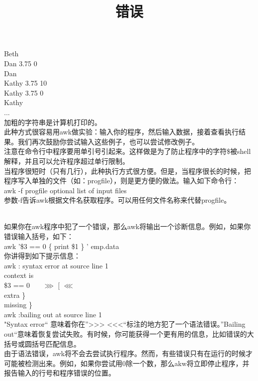 \documentclass[10pt,fancyhdr,UTF-8]{ctexart}
\begin{document}
Beth  \\
Dan       3.75      0 \\
Dan   \\ 
Kathy     3.75      10 \\
Kathy     3.75      0 \\
Kathy \\
...   \\
加粗的字符串是计算机打印的。 \\
此种方式很容易用awk做实验：输入你的程序，然后输入数据，接着查看执行结果。我们再次鼓励你尝试输入这些例子，也可以尝试修改例子。 \\
注意在命令行中程序要用单引号引起来。这样做是为了防止程序中的字符\$被shell解释，并且可以允许程序超过单行限制。 \\
当程序很短时（只有几行），此种执行方式很方便。但是，当程序很长的时候，把程序写入单独的文件（如：progfile），则是更方便的做法。输入如下命令行： \\
awk  -f  progfile  optional  list   of  input  files \\
参数-f告诉awk根据文件名获取程序。可以用任何文件名称来代替progfile。 \\
\indent\title{\textbf{错误}} \\
如果你在awk程序中犯了一个错误，那么awk将输出一个诊断信息。例如，如果你错误输入括号，如下：\\
awk   '\$3 == 0 \{  print \$1 \} '  emp.data \\
你讲得到如下提示信息： \\
awk : syntax  error  at  source  line 1 \\
   context   is \\
   \$3 == 0 \ \ \ \emph{$\ggg$} [  \emph{$\lll$} \\
      extra  \}  \\
	  missing \} \\
   awk :bailing  out at source  line 1 \\
\indent"Syntax error“ 意味着你在”>>> <<<“标注的地方犯了一个语法错误。”Bailing out“意味着恢复尝试失败。有时候，你可能获得一个更有用的信息，比如错误的大括号或圆括号匹配信息。 \\
\indent 由于语法错误，awk将不会去尝试执行程序。然而，有些错误只有在运行的时候才可能被检测出来。例如，如果你尝试用0除一个数，那么akw将立即停止程序，并报告输入的行号和程序错误的位置。 \\
\end{document}
